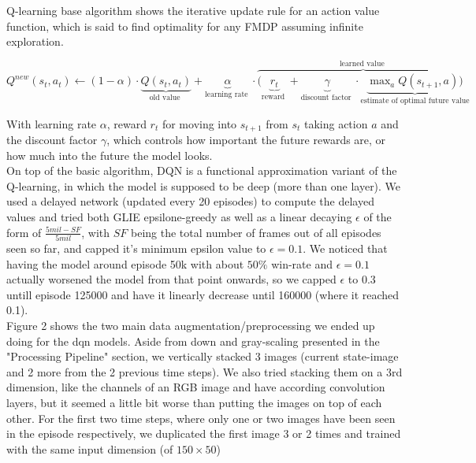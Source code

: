
Q-learning base algorithm shows the iterative update rule for an action value function, which is said to find optimality for any FMDP assuming infinite exploration.


$Q^{n e w}\left(s_{t}, a_{t}\right) \leftarrow(1-\alpha) \cdot \underbrace{Q\left(s_{t}, a_{t}\right)}_{\text {old value }}+\underbrace{\alpha}_{\text {learning rate }} \cdot \overbrace{(\underbrace{r_{t}}_{\text {reward }} +  \underbrace{\gamma}_{\text {discount factor }}\cdot \underbrace{\max_{a}Q\left(s_{t+1}, a\right))}_{\text{estimate of optimal future value}}}^{\text {learned value }}$

\noindent
With learning rate $\alpha$, reward $r_t$ for moving into $s_{t+1}$ from $s_t$ taking action $a$ and the discount factor $\gamma$, which controls how important the future rewards are, or how much into the future the model looks.\\

\noindent
On top of the basic algorithm, DQN is a functional approximation variant of the Q-learning, in which the model is supposed to be deep (more than one layer). We used a delayed network (updated every 20 episodes) to compute the delayed values and tried both GLIE epsilone-greedy as well as a linear decaying $\epsilon$ of the form of $\frac{5mil-SF}{5mil}$, with $SF$ being the total number of frames out of all episodes seen so far, and capped it's minimum epsilon value to $\epsilon=0.1$. We noticed that having the model around episode 50k with about $50\%$ win-rate and $\epsilon=0.1$ actually worsened the model from that point onwards, so we capped $\epsilon$ to 0.3 untill episode 125000 and have it linearly decrease until 160000 (where it reached 0.1).\\

\noindent
Figure 2 shows the two main data augmentation/preprocessing we ended up doing for the dqn models. Aside from down and gray-scaling presented in the "Processing Pipeline" section, we vertically stacked 3 images (current state-image and 2 more from the 2 previous time steps). We also tried stacking them on a 3rd dimension, like the channels of an RGB image and have according convolution layers, but it seemed a little bit worse than putting the images on top of each other. For the first two time steps, where only one or two images have been seen in the episode respectively, we duplicated the first image 3 or 2 times and trained with the same input dimension (of $150\times 50$)\\



